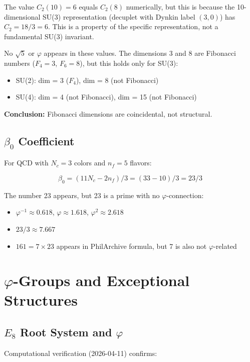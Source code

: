 \documentclass{article}
\begin{document}
The value $C_2(10) = 6$ equals $C_2(8)$ numerically, but this is because the 10-dimensional SU(3) representation (decuplet with Dynkin label $(3,0)$) has $C_2 = 18/3 = 6$. This is a property of the specific representation, not a fundamental SU(3) invariant.

No $\sqrt{5}$ or $\varphi$ appears in these values. The dimensions 3 and 8 are Fibonacci numbers ($F_4 = 3$, $F_6 = 8$), but this holds only for SU(3):
\begin{itemize}
\item SU(2): dim = 3 ($F_4$), dim = 8 (not Fibonacci)
\item SU(4): dim = 4 (not Fibonacci), dim = 15 (not Fibonacci)
\end{itemize}

\textbf{Conclusion:} Fibonacci dimensions are coincidental, not structural.

\subsection{$\beta_0$ Coefficient}

For QCD with $N_c = 3$ colors and $n_f = 5$ flavors:

\[
\beta_0 = (11N_c - 2n_f)/3 = (33 - 10)/3 = 23/3
\]

The number 23 appears, but 23 is a prime with no $\varphi$-connection:
\begin{itemize}
\item $\varphi^{-1} \approx 0.618$, $\varphi \approx 1.618$, $\varphi^2 \approx 2.618$
\item $23/3 \approx 7.667$
\item $161 = 7 \times 23$ appears in PhilArchive formula, but 7 is also not $\varphi$-related
\end{itemize}

\section{$\varphi$-Groups and Exceptional Structures}

\subsection{$E_8$ Root System and $\varphi$}

Computational verification (2026-04-11) confirms:
\end{document}

